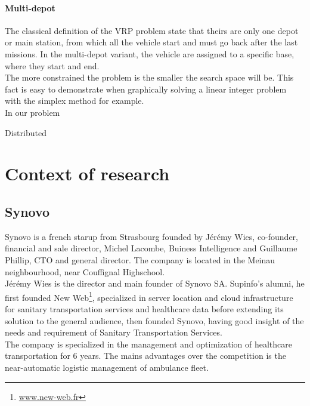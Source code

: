 \documentclass[12pt]{memoir}
\begin{document}
\paragraph{Multi-depot} %
\label{par:Multi-depot}
The classical definition of the VRP problem state that theirs are only one depot or
main station, from which all the vehicle start and must go back after the last
missions. In the multi-depot variant, the vehicle are assigned to a specific base,
where they start and end.\\

The more constrained the problem is the smaller the search space will be. This fact
is easy to demonstrate when graphically solving a linear integer problem with the
simplex method for example.\\
In our problem

Distributed 

\section{Context of research}
\subsection{Synovo} %

Synovo is a french starup from Strasbourg founded by Jérémy Wies, co-founder, financial and sale director, Michel Lacombe, Buiness Intelligence and Guillaume Phillip, CTO and general director. The company is located in the Meinau neighbourhood, near Couffignal Highschool.\\
Jérémy Wies is the director and main founder of Synovo SA. Supinfo's alumni, he first founded New Web\footnote{\url{www.new-web.fr}}, specialized in server location and cloud infrastructure for sanitary transportation services and healthcare data before extending its solution to the general audience, then founded Synovo, having good insight of the needs and requirement of Sanitary Transportation Services.\\
The company is specialized in the management and optimization of healthcare transportation for 6 years. The mains advantages over the competition is the near-automatic logistic management of ambulance fleet. 
\bigskip
\end{document}
